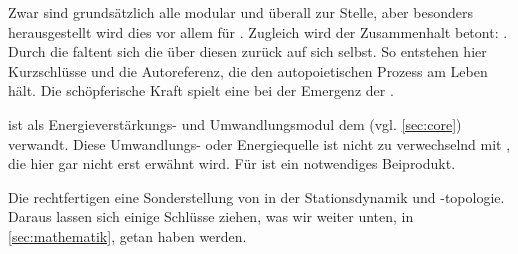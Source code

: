 \begin{newstuff}
    Zwar sind grundsätzlich alle  modular und überall zur Stelle, aber besonders herausgestellt wird dies vor allem für . Zugleich wird der Zusammenhalt betont: .
    Durch die  faltent sich die  über diesen  zurück auf sich selbst. So entstehen hier Kurzschlüsse und die Autoreferenz, die den autopoietischen Prozess am Leben hält. Die schöpferische Kraft  spielt eine bei der Emergenz der .

     ist als Energieverstärkungs- und Umwandlungsmodul dem  (vgl. \cref{sec:core}) verwandt. Diese Umwandlungs- oder Energiequelle  ist nicht zu verwechselnd mit , die hier gar nicht erst erwähnt wird. Für  ist  ein notwendiges Beiprodukt.
    
    Die  rechtfertigen eine Sonderstellung von  in der Stationsdynamik und -topologie. Daraus lassen sich einige Schlüsse ziehen, was wir weiter unten, in \cref{sec:mathematik}, getan haben werden. 
\end{newstuff}